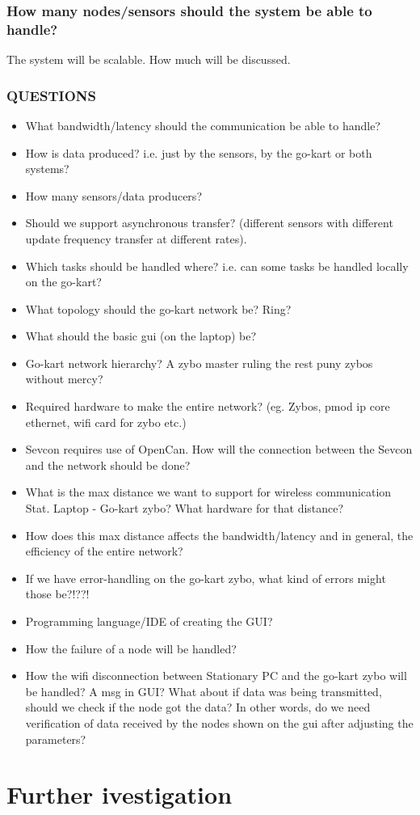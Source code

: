 \subsubsection{How many nodes/sensors should the system be able to handle?}
The system will be scalable. How much will be discussed.


\subsubsection{QUESTIONS}
\begin{itemize}{}
\item What bandwidth/latency should the communication be able to handle?
\item How is data produced? i.e. just by the sensors, by the go-kart or both systems?
\item How many sensors/data producers?\\
\item Should we support asynchronous transfer? (different sensors with different 
update frequency transfer at different rates).\\
\item Which tasks should be handled where? i.e. can some tasks be handled locally on 
the go-kart?
\item What topology should the go-kart network be? Ring?
\item What should the basic gui (on the laptop) be?
\item Go-kart network hierarchy? A zybo master ruling the rest puny zybos without mercy?
\item Required hardware to make the entire network? (eg. Zybos, pmod ip core ethernet, wifi card for zybo etc.)
\item Sevcon requires use of OpenCan. How will the connection between the Sevcon and the network should be done?
\item What is the max distance we want to support for wireless communication Stat. Laptop - Go-kart zybo? What hardware for that distance?
\item How does this max distance affects the bandwidth/latency and in general, the efficiency of the entire network?
\item If we have error-handling on the go-kart zybo, what kind of errors might those be?!??!
\item Programming language/IDE of creating the GUI?
\item How the failure of a node will be handled?
\item How the wifi disconnection between Stationary PC and the go-kart zybo will be handled? A msg in GUI? What about if data was being transmitted, should we check if the node got the data? In other words, do we need verification of data received by the nodes shown on the gui after adjusting the parameters?

\end{itemize}


\section{Further ivestigation}
